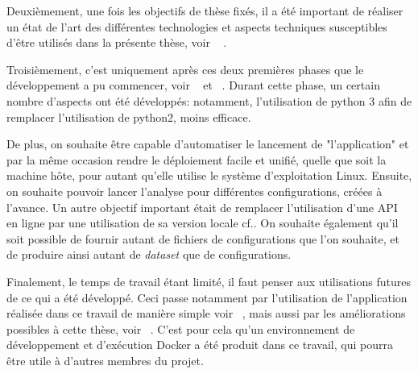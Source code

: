 Deuxièmement, une fois les objectifs de thèse fixés, il a été important de réaliser un état de l'art des différentes technologies et aspects techniques susceptibles d'être utilisés dans la présente thèse, voir ~ .

Troisièmement, c'est uniquement après ces deux premières phases que le développement a pu commencer, voir ~ et ~.
Durant cette phase, un certain nombre d'aspects ont été développés:
notamment, l'utilisation de python 3 afin de remplacer l'utilisation de python2, moins efficace.

De plus, on souhaite être capable d'automatiser le lancement de "l'application" et par la même occasion rendre le déploiement facile et unifié, quelle que soit la machine hôte, pour autant qu'elle utilise le système d'exploitation Linux. Ensuite, on souhaite pouvoir lancer l'analyse pour différentes configurations, créées à l'avance. Un autre objectif important était de remplacer l'utilisation d'une API en ligne par une utilisation de sa version locale cf.. On souhaite également qu'il soit possible de fournir autant de fichiers de configurations que l'on souhaite, et de produire ainsi autant de \emph{dataset} que de configurations.

Finalement, le temps de travail étant limité, il faut penser aux utilisations futures de ce qui a été développé. Ceci passe notamment par l'utilisation de l'application réalisée dans ce travail de manière simple voir ~, mais aussi par les améliorations possibles à cette thèse, voir ~. C'est pour cela qu'un environnement de développement et d'exécution Docker a été produit dans ce travail, qui pourra être utile à d'autres membres du projet. 

